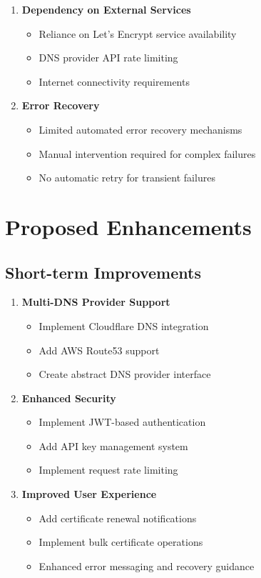 \begin{enumerate}
    \item \textbf{Dependency on External Services}
    \begin{itemize}
        \item Reliance on Let's Encrypt service availability
        \item DNS provider API rate limiting
        \item Internet connectivity requirements
    \end{itemize}
    
    \item \textbf{Error Recovery}
    \begin{itemize}
        \item Limited automated error recovery mechanisms
        \item Manual intervention required for complex failures
        \item No automatic retry for transient failures
    \end{itemize}
\end{enumerate}

\section{Proposed Enhancements}

\subsection{Short-term Improvements}

\begin{enumerate}
    \item \textbf{Multi-DNS Provider Support}
    \begin{itemize}
        \item Implement Cloudflare DNS integration
        \item Add AWS Route53 support
        \item Create abstract DNS provider interface
    \end{itemize}
    
    \item \textbf{Enhanced Security}
    \begin{itemize}
        \item Implement JWT-based authentication
        \item Add API key management system
        \item Implement request rate limiting
    \end{itemize}
    
    \item \textbf{Improved User Experience}
    \begin{itemize}
        \item Add certificate renewal notifications
        \item Implement bulk certificate operations
        \item Enhanced error messaging and recovery guidance
    \end{itemize}
\end{enumerate}

